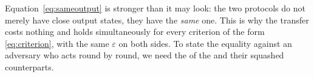 
Equation~\eqref{eq:sameoutput} is stronger than it may look: the two protocols
do not merely have close output states, they have the \emph{same} one. This is
why the transfer costs nothing and holds simultaneously for every criterion of
the form \eqref{eq:criterion}, with the same $\varepsilon$ on both sides. To
state the equality against an adversary who acts round by round, we need the
 of the  and their
squashed counterparts.


